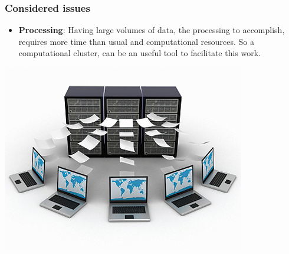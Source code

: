 \begin{frame}
\frametitle{Considered issues}
\begin{itemize}
	\item \textbf{Processing}: Having large volumes of data, the processing to accomplish, requires more time than usual
		and computational resources. So a computational cluster, can be an useful tool to facilitate this work.
\end{itemize}

\begin{center}
\includegraphics[height=0.3\textheight]{img/processing}
\end{center}

\end{frame}
